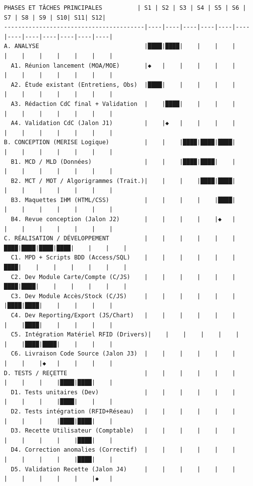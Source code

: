 \documentclass[11pt]{article}
\begin{document}
\begin{exoresolu}
\begin{lstlisting}[language=text, basicstyle=\ttfamily\small]
PHASES ET TÂCHES PRINCIPALES          | S1 | S2 | S3 | S4 | S5 | S6 | S7 | S8 | S9 | S10| S11| S12|
----------------------------------------|----|----|----|----|----|----|----|----|----|----|----|----|
A. ANALYSE                              |████|████|    |    |    |    |    |    |    |    |    |    |
  A1. Réunion lancement (MOA/MOE)       |◆   |    |    |    |    |    |    |    |    |    |    |    |
  A2. Étude existant (Entretiens, Obs)  |████|    |    |    |    |    |    |    |    |    |    |    |
  A3. Rédaction CdC final + Validation  |    |████|    |    |    |    |    |    |    |    |    |    |
  A4. Validation CdC (Jalon J1)         |    |◆   |    |    |    |    |    |    |    |    |    |    |
B. CONCEPTION (MERISE Logique)          |    |    |████|████|████|    |    |    |    |    |    |    |
  B1. MCD / MLD (Données)               |    |    |████|████|    |    |    |    |    |    |    |    |
  B2. MCT / MOT / Algorigrammes (Trait.)|    |    |    |████|████|    |    |    |    |    |    |    |
  B3. Maquettes IHM (HTML/CSS)          |    |    |    |    |████|    |    |    |    |    |    |    |
  B4. Revue conception (Jalon J2)       |    |    |    |    |◆   |    |    |    |    |    |    |    |
C. RÉALISATION / DÉVELOPPEMENT          |    |    |    |    |    |████|████|████|████|    |    |    |
  C1. MPD + Scripts BDD (Access/SQL)    |    |    |    |    |    |████|    |    |    |    |    |    |
  C2. Dev Module Carte/Compte (C/JS)    |    |    |    |    |    |████|████|    |    |    |    |    |
  C3. Dev Module Accès/Stock (C/JS)     |    |    |    |    |    |    |████|████|    |    |    |    |
  C4. Dev Reporting/Export (JS/Chart)   |    |    |    |    |    |    |    |████|    |    |    |    |
  C5. Intégration Matériel RFID (Drivers)|    |    |    |    |    |    |    |████|████|    |    |    |
  C6. Livraison Code Source (Jalon J3)  |    |    |    |    |    |    |    |    |◆   |    |    |    |
D. TESTS / REÇETTE                      |    |    |    |    |    |    |    |    |    |████|████|    |
  D1. Tests unitaires (Dev)             |    |    |    |    |    |    |    |    |    |████|    |    |
  D2. Tests intégration (RFID+Réseau)   |    |    |    |    |    |    |    |    |    |████|████|    |
  D3. Recette Utilisateur (Comptable)   |    |    |    |    |    |    |    |    |    |    |████|    |
  D4. Correction anomalies (Correctif)  |    |    |    |    |    |    |    |    |    |    |████|    |
  D5. Validation Recette (Jalon J4)     |    |    |    |    |    |    |    |    |    |    |    |◆   |

\end{lstlisting}
\end{exoresolu}
\end{document}
